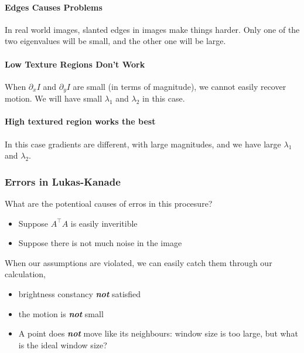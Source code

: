 \documentclass[11pt]{article}
\begin{document}
\paragraph{Edges Causes Problems}
In real world images, slanted edges in images make things harder. Only one of the two eigenvalues will be small, and the other one will be large. 

\paragraph{Low Texture Regions Don't Work} When $\partial_x I$ and $\partial_y I$ are small (in terms of magnitude), we cannot easily recover motion. We will have small $\lambda_1$ and $\lambda_2$ in this case. 

\paragraph{High textured region works the best} In this case gradients are different, with large magnitudes, and we have large $\lambda_1$ and $\lambda_2$. 


\subsubsection{Errors in Lukas-Kanade}
What are the potentioal causes of erros in this procesure? 
\begin{itemize}
	\item Suppose $A^\top A$ is easily inveritible
	\item Suppose there is not much noise in the image
\end{itemize}
When our assumptions are violated, we can easily catch them through our calculation, 
\begin{itemize}
	\item brightness constancy \textit{\textbf{not}} satisfied
	\item the motion is \textit{\textbf{not}} small
	\item A point does \textit{\textbf{not}} move like its neighbours: window size is too large, but what is the ideal window size? 
\end{itemize}
\end{document}
